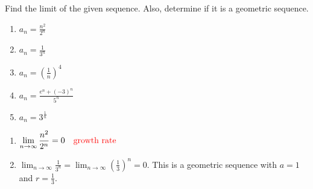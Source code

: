 \documentclass[]{ximera}
\begin{document}
\begin{problem}
Find the limit of the given sequence.  
Also, determine if it is a geometric sequence.
	\begin{multicols}{3}
	\begin{enumerate}
	
	\item  $a_n = \frac{n^2}{2^n}$
	
	
	
	
	\item  $a_n = \frac{1}{3^n}$
	
	
	
	
	\item  $a_n = \left( \frac{1}{n} \right)^4$
	
	
	
	
	\item  $a_n = \frac{e^n + (-3)^n}{5^n}$
	
	
	
	
	\item  $a_n = 3^{\frac{1}{n}}$
	
	
	\end{enumerate}
	\end{multicols}
	
	\begin{freeResponse}
	\begin{enumerate}
	\item 	$\lim_{n \to \infty} \frac{n^2}{2^n} = 0 	\quad	{\color{red}\text{growth rate}}$
	
	\item  $\lim_{n \to \infty} \frac{1}{3^n} = \lim_{n \to \infty} \left( \frac{1}{3} \right)^n = 0.$
	This is a geometric sequence with $a = 1$ and $r = \frac{1}{3}$.  
	

\end{enumerate}
\end{freeResponse}
\end{problem}
\end{document}
